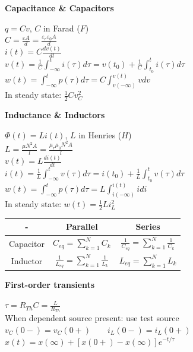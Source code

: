 \documentclass[twocolumn]{tudelft}
\begin{document}
\textbf{Capacitance \& Capacitors}

$\displaystyle q=Cv$, $C$ in Farad ($F$) \\
$\displaystyle C = \frac{\varepsilon A}{d} = \frac{\varepsilon_r\varepsilon_0A}{d}$ \\
$\displaystyle i(t) = C\frac{dv(t)}{dt}$\\
$\displaystyle v(t) = \frac1C \int_{-\infty}^{t}i(\tau)d\tau = v(t_0) + \frac1C \int_{t_0}^{t}i(\tau)d\tau  $ \\
$\displaystyle w(t) = \int_{-\infty}^{t}p(\tau)d\tau = C \int_{v(-\infty)}^{v(t)}vdv$\\
In steady state: $\displaystyle \frac12 C v_C^2$

\textbf{Inductance \& Inductors}

$\displaystyle \Phi(t) = Li(t)$, $L$ in Henries ($H$) \\
$\displaystyle L = \frac{\mu N^2 A}{l} = \frac{\mu_r \mu_0 N^2 A}{l} $ \\
$\displaystyle v(t) = L\frac{di(t)}{dt} $ \\
$\displaystyle i(t) = \frac1L\int_{-\infty}^{t} v(\tau)d\tau = i(t_0) + \frac1L \int_{t_0}^{t}v(\tau)d\tau$ \\
$\displaystyle w(t) = \int_{-\infty}^{t}p(\tau)d\tau = L\int_{i(-\infty)}^{i(t)}idi $ \\
In steady state: $\displaystyle w(t) = \frac12 L i_L^2$ \\

\begin{tabular}{ccc}
	- & Parallel & Series \\
	\hline
	Capacitor & $\displaystyle C_{eq} = \sum_{k=1}^N C_k$ & $\displaystyle \frac{1}{C_{eq}} = \sum_{k=1}^{N} \frac{1}{C_k}$\\
	Inductor & $\displaystyle \frac{1}{L_{eq}} = \sum_{k=1}^{N} \frac{1}{L_k}$ & $\displaystyle L_{eq} = \sum_{k=1}^N L_k$ \\

	\hline
\end{tabular}

\textbf{First-order transients}

$\displaystyle \tau = R_{Th}C = \frac{L}{R_{Th}}$ \\
When dependent source present: use test source \\
$\displaystyle v_C(0-) = v_C(0+) \hspace{2em} i_L(0-) = i_L(0+)$\\
$\displaystyle x(t) = x(\infty) + \left[ x(0+) - x(\infty) \right] e^{-t/\tau}$
\end{document}
